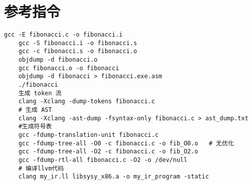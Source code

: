 \documentclass[a4paper]{article}
\begin{document}
\section{参考指令}
\begin{lstlisting}[language=text,caption={汇编指令}]
    gcc -E fibonacci.c -o fibonacci.i
    gcc -S fibonacci.i -o fibonacci.s
    gcc -c fibonacci.s -o fibonacci.o
    objdump -d fibonacci.o
    gcc fibonacci.o -o fibonacci
    objdump -d fibonacci > fibonacci.exe.asm
    ./fibonacci
    生成 token 流
    clang -Xclang -dump-tokens fibonacci.c
    # 生成 AST 
    clang -Xclang -ast-dump -fsyntax-only fibonacci.c > ast_dump.txt
    #生成符号表
    gcc -fdump-translation-unit fibonacci.c
    gcc -fdump-tree-all -O0 -c fibonacci.c -o fib_O0.o   # 无优化
    gcc -fdump-tree-all -O2 -c fibonacci.c -o fib_O2.o
    gcc -fdump-rtl-all fibonacci.c -O2 -o /dev/null
    # 编译llvm代码
    clang my_ir.ll libsysy_x86.a -o my_ir_program -static
\end{lstlisting}
% 
%  
\end{document}
